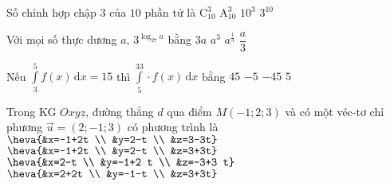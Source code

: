 \begin{ex}%
	Số chỉnh hợp chập $3$ của $10$ phần tử là
	\choice
	{$\mathrm{C}_{10}^3$}
	{\True $\mathrm{A}_{10}^3$}
	{$10^3$}
	{$3^{10}$}
\end{ex}

\begin{ex}%
	Với mọi số thực dương $a$, $3^{\log _{27}a}$ bằng
	\choice
	{$3a$}
	{\True $a^3$}
	{$a^{\tfrac{1}{3}}$}
	{$\dfrac{a}{3}$}
\end{ex}

\begin{ex}%
	Nếu $\displaystyle\int\limits_3^5f(x) \mathrm{\,d} x=15$ thì $\displaystyle\int\limits_5^33 \cdot f(x) \mathrm{\,d} x$ bằng
	\choice
	{$45$}
	{$-5$}
	{\True $-45$}
	{$5$}
\end{ex}

\begin{ex}%
	Trong KG $Oxyz$, đường thẳng $d$ qua điểm $M(-1;2;3)$ và có một véc-tơ chỉ phương $\overrightarrow{u}=(2;-1;3)$ có phương trình là
	\choice
	{$\heva{&x=-1+2t \\ &y=2-t \\ &z=3-3t}$}
	{\True $\heva{&x=-1+2t \\ &y=2-t \\ &z=3+3t}$}
	{$\heva{&x=2-t \\ &y=-1+2 t \\ &z=-3+3 t}$}
	{$\heva{&x=2+2t \\ &y=-1-t \\ &z=3+3t}$}
\end{ex}


